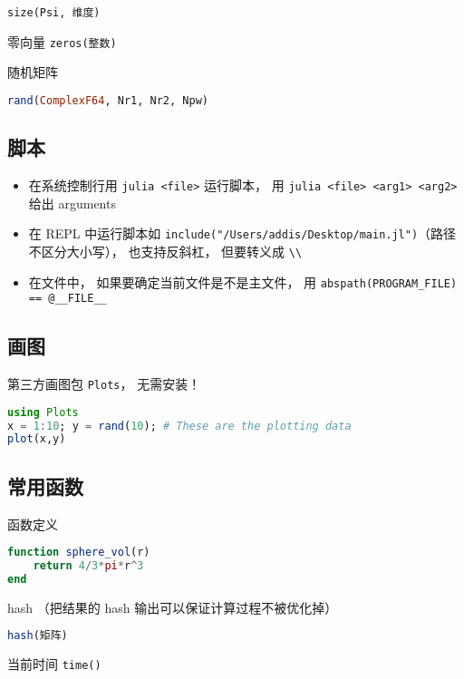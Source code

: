\verb|size(Psi, 维度)|

零向量 \verb|zeros(整数)|

随机矩阵
\begin{lstlisting}[language=julia]
rand(ComplexF64, Nr1, Nr2, Npw)
\end{lstlisting}

\subsection{脚本}
\begin{itemize}
\item 在系统控制行用 \verb|julia <file>| 运行脚本， 用 \verb|julia <file> <arg1> <arg2>| 给出 arguments
\item 在 REPL 中运行脚本如 \verb|include("/Users/addis/Desktop/main.jl")|（路径不区分大小写）， 也支持反斜杠， 但要转义成 \verb|\\|
\item 在文件中， 如果要确定当前文件是不是主文件， 用 \verb|abspath(PROGRAM_FILE) == @__FILE__|
\end{itemize}

\subsection{画图}
第三方画图包 \verb|Plots|， 无需安装！
\begin{lstlisting}[language=julia]
using Plots
x = 1:10; y = rand(10); # These are the plotting data
plot(x,y)
\end{lstlisting}

\subsection{常用函数}
函数定义
\begin{lstlisting}[language=julia]
function sphere_vol(r)
    return 4/3*pi*r^3
end
\end{lstlisting}

hash （把结果的 hash 输出可以保证计算过程不被优化掉）
\begin{lstlisting}[language=julia]
hash(矩阵)
\end{lstlisting}

当前时间 \verb|time()|
